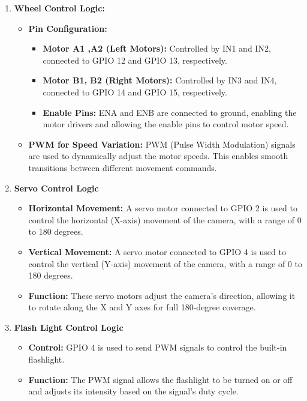 \documentclass[12pt,a4paper]{report}
\begin{document}
\begin{enumerate}

\item \textbf{Wheel Control Logic:}
\begin{itemize}
    \item \textbf{Pin Configuration:}
    \begin{itemize}
        \item \textbf{Motor A1 ,A2 (Left Motors):} Controlled by IN1 and IN2, connected to GPIO 12 and GPIO 13, respectively.
        \item \textbf{Motor B1, B2 (Right Motors):} Controlled by IN3 and IN4, connected to GPIO 14 and GPIO 15, respectively.
        \item \textbf{Enable Pins:} ENA and ENB are connected to ground, enabling the motor drivers and allowing the enable pins to control motor speed.
    \end{itemize}
    \item \textbf{PWM for Speed Variation:} PWM (Pulse Width Modulation) signals are used to dynamically adjust the motor speeds. This enables smooth transitions between different movement commands.
\end{itemize}


\item \textbf{Servo Control Logic}
\begin{itemize}
    \item \textbf{Horizontal Movement:} A servo motor connected to GPIO 2 is used to control the horizontal (X-axis) movement of the camera, with a range of 0 to 180 degrees.
    \item \textbf{Vertical Movement:} A servo motor connected to GPIO 4 is used to control the vertical (Y-axis) movement of the camera, with a range of 0 to 180 degrees.
    \item \textbf{Function:} These servo motors adjust the camera's direction, allowing it to rotate along the X and Y axes for full 180-degree coverage.
\end{itemize}


\item \textbf{Flash Light Control Logic}
\begin{itemize}
    \item \textbf{Control:} GPIO 4 is used to send PWM signals to control the built-in flashlight.
    \item \textbf{Function:} The PWM signal allows the flashlight to be turned on or off and adjusts its intensity based on the signal's duty cycle.
\end{itemize}



\end{enumerate}
\end{document}
